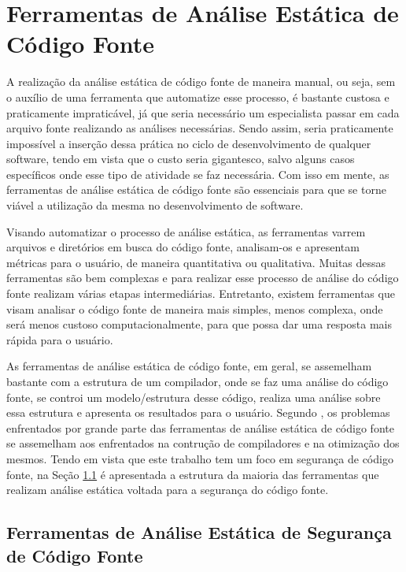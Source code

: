 \chapter{Ferramentas de Análise Estática de Código Fonte}\label{chap:ferramentas}

A realização da análise estática de código fonte de maneira manual, ou seja, sem
o auxílio de uma ferramenta que automatize esse processo, é bastante custosa e
praticamente impraticável, já que seria necessário um especialista passar em
cada arquivo fonte realizando as análises necessárias. Sendo assim, seria
praticamente impossível a inserção dessa prática no ciclo de desenvolvimento de
qualquer software, tendo em vista que o custo seria gigantesco, salvo alguns
casos específicos onde esse tipo de atividade se faz necessária. Com isso em
mente, as ferramentas de análise estática de código fonte são essenciais para
que se torne viável a utilização da mesma no desenvolvimento de software.

Visando automatizar o processo de análise estática, as ferramentas varrem
arquivos e diretórios em busca do código fonte, analisam-os e apresentam
métricas para o usuário, de maneira quantitativa ou qualitativa. Muitas dessas
ferramentas são bem complexas e para realizar esse processo de análise do
código fonte realizam várias etapas intermediárias. Entretanto, existem
ferramentas que visam analisar o código fonte de maneira mais simples, menos
complexa, onde será menos custoso computacionalmente, para que possa dar uma
resposta mais rápida para o usuário.

As ferramentas de análise estática de código fonte, em geral, se assemelham
bastante com a estrutura de um compilador, onde se faz uma análise do código
fonte, se controi um modelo/estrutura desse código, realiza uma análise sobre
essa estrutura e apresenta os resultados para o usuário. Segundo
, os problemas enfrentados por grande parte das
ferramentas de análise estática de código fonte se assemelham aos enfrentados na
contrução de compiladores e na otimização dos mesmos. Tendo em vista que este
trabalho tem um foco em segurança de código fonte, na Seção
\ref{sec:ferramentasseguranca} é apresentada a estrutura da maioria das
ferramentas que realizam análise estática voltada para a segurança do código
fonte.


\section{Ferramentas de Análise Estática de Segurança de Código Fonte}
\label{sec:ferramentasseguranca}

